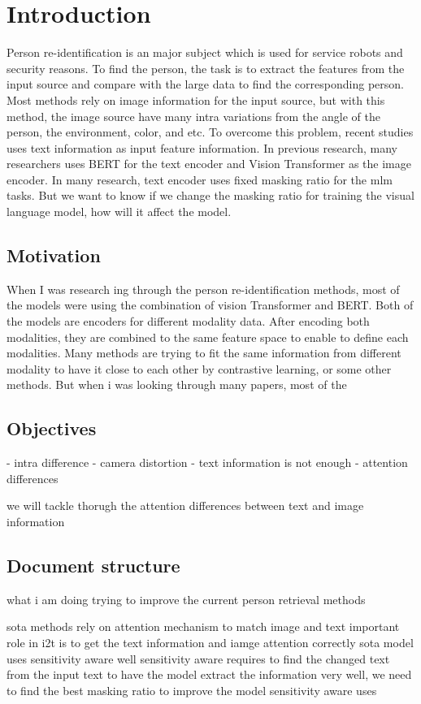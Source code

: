 \chapter{Introduction}

Person re-identification is an major subject which is used for service robots and security reasons. 
To find the person, the task is to extract the features from the input source and compare with the large data to find the corresponding person. Most methods rely on image information for the input source,%
 but with this method, the image source have many intra variations from the angle of the person, the environment, color, and etc.
To overcome this problem, recent studies uses text information as input feature information. 
In previous research, many researchers uses BERT for the text encoder and Vision Transformer as the image encoder. In many research, text encoder uses fixed masking ratio for the mlm tasks. But we want to know if we change the masking ratio for training the visual language model, how will it affect the model. 

\section{Motivation}
When I was research ing through the person re-identification methods, most of the models were using the combination of vision Transformer and BERT. Both of the models are encoders for different modality data. After encoding both modalities, they are combined to the same feature space to enable to define each modalities. Many methods are trying to fit the same information from different modality to have it close to each other by contrastive learning, or some other methods. %
But when i was looking through many papers, most of the 

\section{Objectives}
- intra difference
- camera distortion
- text information is not enough
- attention differences

we will tackle thorugh the attention differences between text and image information

\section{Document structure}

what i am doing 
trying to improve the current person retrieval methods

sota methods rely on attention mechanism to match image and text 
important role in i2t is to get the text information and iamge attention correctly 
sota model uses sensitivity aware well 
sensitivity aware requires to find the changed text from the input text 
to have the model extract the information very well, we need to find the best masking ratio to improve the model
sensitivity aware uses 